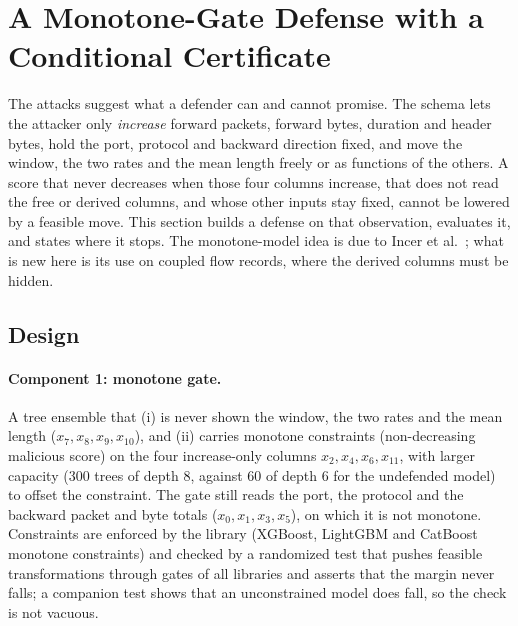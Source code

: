 \section{A Monotone-Gate Defense with a Conditional Certificate}
\label{sec:defense}

The attacks suggest what a defender can and cannot promise. The schema lets the attacker only \emph{increase} forward packets, forward bytes, duration and header bytes, hold the port, protocol and backward direction fixed, and move the window, the two rates and the mean length freely or as functions of the others. A score that never decreases when those four columns increase, that does not read the free or derived columns, and whose other inputs stay fixed, cannot be lowered by a feasible move. This section builds a defense on that observation, evaluates it, and states where it stops. The monotone-model idea is due to Incer et al.~\cite{incer2018adversarially}; what is new here is its use on coupled flow records, where the derived columns must be hidden.

\subsection{Design}
\label{sec:defense_design}

\paragraph{Component 1: monotone gate.} A tree ensemble that (i) is never shown the window, the two rates and the mean length ($x_7,x_8,x_9,x_{10}$), and (ii) carries monotone constraints (non-decreasing malicious score) on the four increase-only columns $x_2,x_4,x_6,x_{11}$, with larger capacity (300 trees of depth 8, against 60 of depth 6 for the undefended model) to offset the constraint. The gate still reads the port, the protocol and the backward packet and byte totals ($x_0,x_1,x_3,x_5$), on which it is not monotone. Constraints are enforced by the library (XGBoost, LightGBM and CatBoost monotone constraints) and checked by a randomized test that pushes feasible transformations through gates of all libraries and asserts that the margin never falls; a companion test shows that an unconstrained model does fall, so the check is not vacuous.

